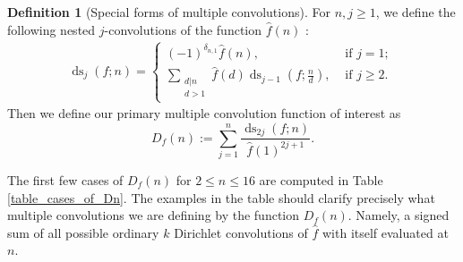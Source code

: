 \documentclass[12pt,reqno,a4letter]{article}
\numberwithin{figure}{section}
\numberwithin{table}{section}
\numberwithin{equation}{section}
\DeclareMathOperator{\ds}{ds}
\theoremstyle{plain}
\numberwithin{theorem}{section}
\theoremstyle{definition}
\newtheorem{definition}[theorem]{Definition}
\begin{document}
\begin{definition}[Special forms of multiple convolutions] 
\label{def_djn_Dn_func_defs} 
For $n,j \geq 1$, we define the following nested 
$j$-convolutions of the function $\widehat{f}(n)$ 
\cite{MERCA-SCHMIDT-RAMJ}: 
\begin{align*} 
\ds_j(f; n) = \begin{cases} 
     (-1)^{\delta_{n,1}} \widehat{f}(n), & \text{ if $j = 1$; } \\ 
     \sum\limits_{\substack{d|n \\ d>1}} \widehat{f}(d) \ds_{j-1}\left(f; \frac{n}{d}\right), & 
     \text{ if $j \geq 2$. } 
     \end{cases} 
\end{align*} 
Then we define our primary multiple convolution function of interest as 
\[
D_f(n) := \sum_{j=1}^n \frac{\ds_{2j}(f; n)}{\widehat{f}(1)^{2j+1}}. 
\]
\end{definition}

The first few cases of $D_f(n)$ for $2 \leq n \leq 16$ are 
computed in Table \ref{table_cases_of_Dn}. 
The examples in the table should clarify precisely what multiple convolutions 
we are defining by the function $D_f(n)$. Namely, a signed sum of all possible 
ordinary $k$ Dirichlet convolutions of $\widehat{f}$ with itself evaluated at $n$. 
\end{document}
